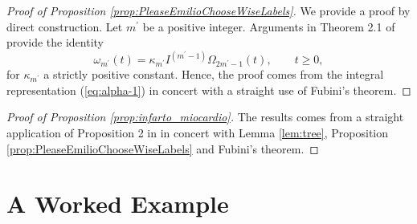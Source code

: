 \documentclass[12pt]{article}
\theoremstyle{plain}
\theoremstyle{remark}
\newcommand{\latMatr}[1]{\mathbf{#1}}          %
\begin{document}
    \begin{proof}[Proof of Proposition \ref{prop:PleaseEmilioChooseWiseLabels}]
    We provide a proof by direct construction. {Let ${m^\prime}$ be a positive integer.} Arguments in Theorem 2.1 of \cite{gneiting1998onalpha} provide the identity 
    \begin{equation}
     \label{omega2Omega}
        \omega_{{m^\prime}} (t) = \kappa_{{m^\prime}} I^{({{m^\prime}}-1)} \Omega_{2{{m^\prime}} -1} (t), \qquad t \ge 0,
    \end{equation}
    for $\kappa_{{m^\prime}}$ a strictly positive constant. Hence, the proof comes from the integral representation (\ref{eq:alpha-1}) %
    in concert with a straight use of Fubini's theorem. 
    \end{proof}
    
    \begin{proof}[Proof of Proposition \ref{prop:infarto_miocardio}]
        The results comes from a straight application of Proposition 2 in \cite{emery2023schoenberg} in concert with Lemma \ref{lem:tree}, Proposition \ref{prop:PleaseEmilioChooseWiseLabels} and Fubini's theorem. 
    \end{proof}    %
\newpage
\section{A Worked Example} \label{A_B}
\end{document}

